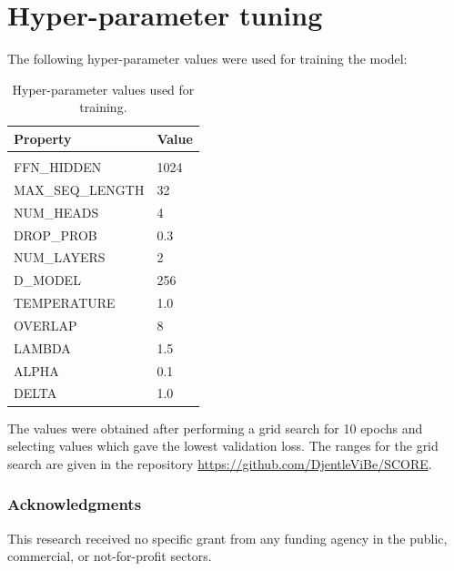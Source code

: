 \documentclass{article} %
\begin{document}
 \section{Hyper-parameter tuning}\label{app:secA2}
The following hyper-parameter values were used for training the model:
  \begin{table}[h]
  \caption{Hyper-parameter values used for training.}
\label{tab:hyperparam}
\begin{center}
  \begin{tabular}{ll}
  \bfseries Property & \bfseries Value
    \\ \hline \\
FFN\_HIDDEN  & 1024 \\
MAX\_SEQ\_LENGTH & 32 \\
NUM\_HEADS & 4 \\
DROP\_PROB & 0.3 \\
NUM\_LAYERS  & 2 \\
D\_MODEL & 256 \\
TEMPERATURE  & 1.0 \\
OVERLAP & 8 \\
LAMBDA & 1.5 \\
ALPHA & 0.1 \\
DELTA  & 1.0 \\
  \end{tabular}
\end{center}
\end{table}
The values were obtained after performing a grid search for 10 epochs and selecting values which gave the lowest validation loss. 
The ranges for the grid search are given in the repository \url{https://github.com/DjentleViBe/SCORE}.
\subsubsection*{Acknowledgments}
This research received no specific grant from any funding agency in the public, commercial,
or not-for-profit sectors.



\end{document}
